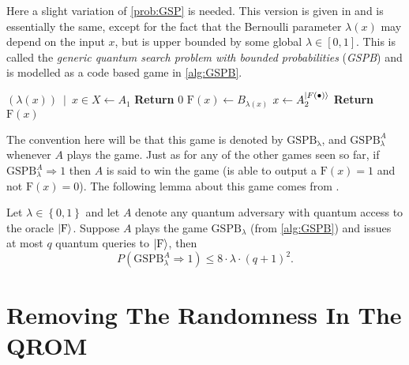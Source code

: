 Here a slight variation of \cref{prob:GSP} is needed. This version is given in \cite{KLS} and is essentially the same, except for the fact that the Bernoulli parameter $\lambda\left(x\right)$ may depend on the input $x$, but is upper bounded by some global $\lambda \in \left[0,1\right]$. This is called the \emph{generic quantum search problem with bounded probabilities} (\emph{GSPB}) and is modelled as a code based game in \cref{alg:GSPB}.
\begin{center}
	\begin{minipage}[ht!]{0.5\textwidth}
		\begin{algorithm}[H]
			\centering
			\caption{$\mathrm{GSPB_{\lambda}}$}
			\label{alg:GSPB}
			\begin{algorithmic}
				\State $\left.\left(\lambda\left(x\right)\right) \ \middle\vert \ x \in X \leftarrow A_1\right.$
					\State \textbf{Return} $0$
				\EndIf
					\State $\mathrm{F}\left(x\right) \leftarrow B_{\lambda\left(x\right)}$
				\EndFor
				\State $x \leftarrow A_2^{\lvert F\left(\bullet\right)\rangle}$
				\State \textbf{Return} $\mathrm{F}\left(x\right)$
			\end{algorithmic}
		\end{algorithm}
	\end{minipage}
\end{center}
The convention here will be that this game is denoted by $\mathrm{GSPB_{\lambda}}$, and $\mathrm{GSPB}_{\lambda}^A$ whenever $A$ plays the game. Just as for any of the other games seen so far, if $\mathrm{GSPB}_{\lambda}^A \Rightarrow 1$ then $A$ is said to win the game (is able to output a $\mathrm{F}\left(x\right) = 1$ and not $\mathrm{F}\left(x\right) = 0$). The following lemma about this game comes from \cite{KLS}.
\begin{lem}
\label{lem:GSPB}
	Let $\lambda \in \left\{ 0,1 \right\}$ and let $A$ denote any quantum adversary with quantum access to the oracle $\lvert\mathrm{F}\rangle$. Suppose $A$ plays the game $\mathrm{GSPB}_{\lambda}$ (from \cref{alg:GSPB}) and issues at most $q$ quantum queries to $\lvert\mathrm{F}\rangle$, then
	\[
		P\left( \mathrm{GSPB}_{\lambda}^A \Rightarrow 1 \right) \leq 8 \cdot \lambda \cdot \left(q + 1\right)^2.
	\]
\end{lem}



\section{Removing The Randomness In The QROM}
\label{sec:theTTraInTheQRO}

